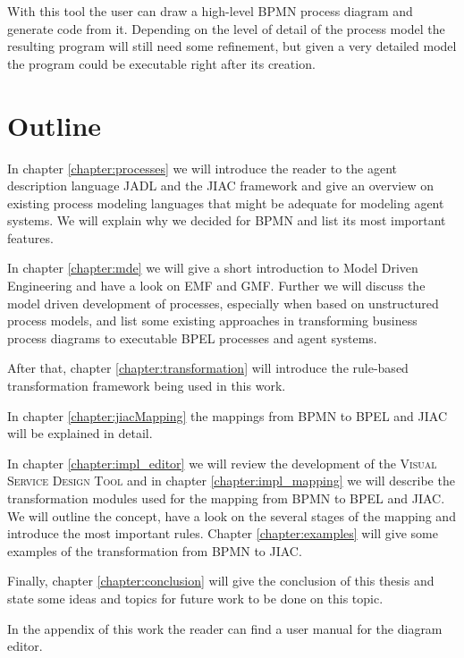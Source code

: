 With this tool the user can draw a high-level BPMN process diagram and generate code from it. Depending on the level of detail of the process model the resulting program will still need some refinement, but given a very detailed model the program could be executable right after its creation.



\section{Outline}

In chapter \ref{chapter:processes} we will introduce the reader to the agent description language JADL and the JIAC framework and give an overview on existing process modeling languages that might be adequate for modeling agent systems. We will explain why we decided for BPMN and list its most important features.

In chapter \ref{chapter:mde} we will give a short introduction to Model Driven Engineering and have a look on EMF and GMF. Further we will discuss the model driven development of processes, especially when based on unstructured process models, and list some existing approaches in transforming business process diagrams to executable BPEL processes and agent systems.

After that, chapter \ref{chapter:transformation} will introduce the rule-based transformation framework being used in this work.

In chapter \ref{chapter:jiacMapping} the mappings from BPMN to BPEL and JIAC will be explained in detail.

In chapter \ref{chapter:impl_editor} we will review the development of the \textsc{Visual Service Design Tool} and in chapter \ref{chapter:impl_mapping} we will describe the transformation modules used for the mapping from BPMN to BPEL and JIAC. We will outline the concept, have a look on the several stages of the mapping and introduce the most important rules. Chapter \ref{chapter:examples} will give some examples of the transformation from BPMN to JIAC.

Finally, chapter \ref{chapter:conclusion} will give the conclusion of this thesis and state some ideas and topics for future work to be done on this topic.

In the appendix of this work the reader can find a user manual for the diagram editor.